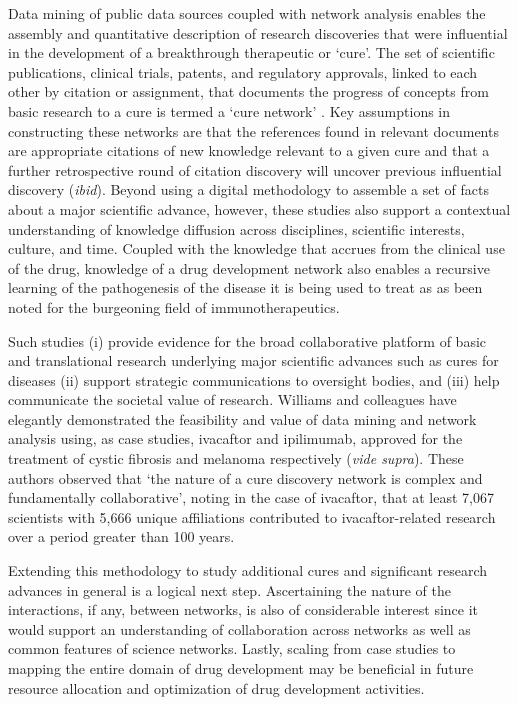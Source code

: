 \documentclass[10pt,letterpaper]{article}
\begin{document}
Data mining of public data sources coupled with network analysis enables the assembly and quantitative description of research discoveries that were influential in the development of a breakthrough therapeutic or `cure'.  The set of scientific publications, clinical trials, patents, and regulatory approvals, linked to each other by citation or assignment, that documents the progress of concepts from basic research to a cure is termed a `cure network' \cite {bibWilliams}. Key assumptions in constructing these networks are that the references found in relevant documents are appropriate citations of new knowledge relevant to a given cure and that a further retrospective round of citation discovery will uncover previous influential discovery (\textit{ibid}). Beyond using a digital methodology to assemble a set of facts about a major scientific advance, however, these studies also support a contextual understanding of knowledge diffusion across disciplines, scientific interests, culture, and time\cite{bibMaldame}. Coupled with the knowledge that accrues from the clinical use of the drug, knowledge of a drug development network also enables a recursive learning of the pathogenesis of the disease it is being used to treat as as been noted for the burgeoning field of immunotherapeutics\cite{bibChan}. 

Such studies (i) provide evidence for the broad collaborative platform of basic and translational research underlying major scientific advances such as cures for diseases (ii) support strategic communications to oversight bodies, and (iii) help communicate the societal value of research\cite {bibLauer}. Williams and colleagues have elegantly demonstrated the feasibility and value of data mining and network analysis using, as case studies, ivacaftor and ipilimumab, approved for the treatment of cystic fibrosis and melanoma respectively (\textit{vide supra}). These authors observed that `the nature of a cure discovery network is complex and fundamentally collaborative', noting in the case of ivacaftor, that at least 7,067 scientists with 5,666 unique affiliations contributed to ivacaftor-related research over a period greater than 100 years. 

Extending this methodology to study additional cures and significant research advances in general is a logical next step. Ascertaining the nature of the interactions, if any, between networks, is also of considerable interest since it would support an understanding of collaboration across networks as well as common features of science networks. Lastly, scaling from case studies to mapping the entire domain of drug development may be beneficial in future resource allocation and optimization of drug development activities. 
\end{document}
